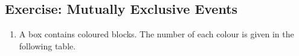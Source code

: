             \subsection{Exercise: Mutually Exclusive Events }
            \nopagebreak
            \label{m39377*id114930}\begin{enumerate}[noitemsep, label=\textbf{\arabic*}. ] 
            \label{m39377*uid79}\item A box contains coloured blocks. The number of each colour is given in
the following table.

    
      
    
    \setlength\mytablespace{10\tabcolsep}
    \addtolength\mytablespace{6\arrayrulewidth}
    \setlength\mytablewidth{\linewidth}
        
    
    \setlength\mytableroom{\mytablewidth}
    \addtolength\mytableroom{-\mytablespace}
    
    \setlength\myfixedwidth{0pt}
    \setlength\mystarwidth{\mytableroom}
        \addtolength\mystarwidth{-\myfixedwidth}
        \divide{}
        
    
\end{enumerate}

